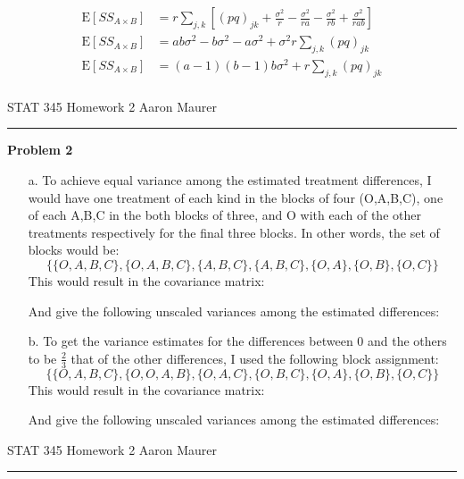 \documentclass[11pt]{article}
\newcommand{\E}{\mathrm{E}}
\theoremstyle{definition}
\begin{document}
\begin{itemize}
\begin{align*}
            \E[SS_{A\times B}] &= r\sum_{j,k} \left[(pq)_{jk} + \frac{\sigma^2}{r} - \frac{\sigma^2}{ra} - \frac{\sigma^2}{rb} + \frac{\sigma^2}{rab}\right] \\  
            \E[SS_{A\times B}] &= ab\sigma^2 -b\sigma^2 -a\sigma^2 +\sigma^2 r\sum_{j,k} (pq)_{jk} \\  
            \E[SS_{A\times B}] &= (a-1)(b-1)b\sigma^2 + r\sum_{j,k} (pq)_{jk} \\  
        \end{align*}
\end{itemize}
\newpage
\null
\newpage
STAT 345 Homework 2 \hfill Aaron Maurer
\vspace{2mm}
\hrule
\vspace{2mm}

{\bf Problem 2}
\begin{itemize}
    \item[a.]
        To achieve equal variance among the estimated treatment differences, I would have one treatment of each kind in the blocks of four (O,A,B,C), one of each A,B,C in the both blocks of three, and O with each of the other treatments respectively for the final three blocks. In other words, the set of blocks would be:
        \[ \{\{O,A,B,C\},\{O,A,B,C\},\{A,B,C\},\{A,B,C\},\{O,A\},\{O,B\},\{O,C\}\} \]
        This would result in the covariance matrix:
            \FloatBarrier
             
            \FloatBarrier
        And give the following unscaled variances among the estimated differences:
            \FloatBarrier
             
            \FloatBarrier
    \item[b.]
        To get the variance estimates for the differences between 0 and the others to be $\frac{2}{3}$ that of the other differences, I used the following block assignment:
        \[ \{\{O,A,B,C\},\{O,O,A,B\},\{O,A,C\},\{O,B,C\},\{O,A\},\{O,B\},\{O,C\}\} \]
        This would result in the covariance matrix:
            \FloatBarrier
             
            \FloatBarrier
        \newpage
        And give the following unscaled variances among the estimated differences:
            \FloatBarrier
             
            \FloatBarrier
\end{itemize}
\newpage
STAT 345 Homework 2 \hfill Aaron Maurer
\vspace{2mm}
\hrule
\vspace{2mm}
\end{document}

